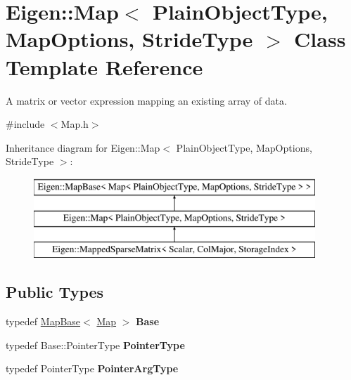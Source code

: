 \hypertarget{class_eigen_1_1_map}{}\section{Eigen\+::Map$<$ Plain\+Object\+Type, Map\+Options, Stride\+Type $>$ Class Template Reference}
\label{class_eigen_1_1_map}


A matrix or vector expression mapping an existing array of data.  




{\ttfamily \#include $<$Map.\+h$>$}

Inheritance diagram for Eigen\+::Map$<$ Plain\+Object\+Type, Map\+Options, Stride\+Type $>$\+:\begin{figure}[H]
\begin{center}
\leavevmode
\includegraphics[height=3.000000cm]{class_eigen_1_1_map}
\end{center}
\end{figure}
\subsection*{Public Types}
\begin{DoxyCompactItemize}
\item 
\mbox{\label{class_eigen_1_1_map_aac0ecf47bc34a57c0a07f5b5a4c27a79}} 
typedef \mbox{\hyperlink{class_eigen_1_1_map_base}{Map\+Base}}$<$ \mbox{\hyperlink{class_eigen_1_1_map}{Map}} $>$ {\bfseries Base}
\item 
\mbox{\label{class_eigen_1_1_map_a252d5ec1d7ae98164e90c9a33d7cb819}} 
typedef Base\+::\+Pointer\+Type {\bfseries Pointer\+Type}
\item 
\mbox{\label{class_eigen_1_1_map_acde9f20a5c8a6bead43e91de080fd154}} 
typedef Pointer\+Type {\bfseries Pointer\+Arg\+Type}
\end{DoxyCompactItemize}
